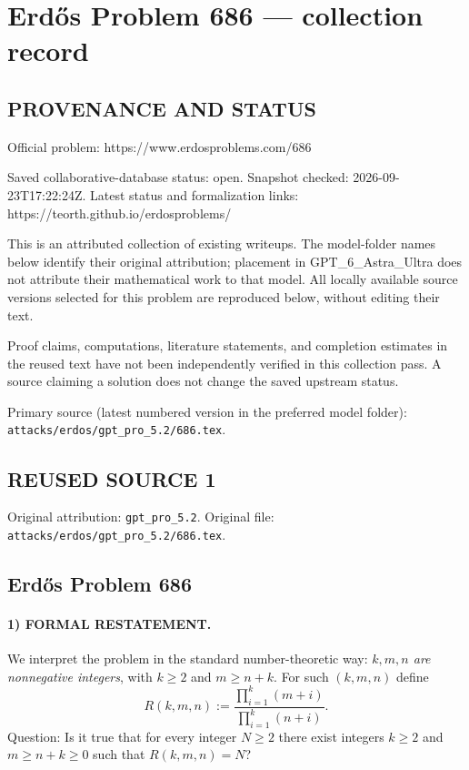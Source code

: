 \section*{Erd\H{o}s Problem 686 --- collection record}

\subsection*{PROVENANCE AND STATUS}
Official problem: https://www.erdosproblems.com/686

Saved collaborative-database status: open.
Snapshot checked: 2026-09-23T17:22:24Z.
Latest status and formalization links: https://teorth.github.io/erdosproblems/

This is an attributed collection of existing writeups. The model-folder names below identify their original attribution; placement in GPT\_6\_Astra\_Ultra does not attribute their mathematical work to that model. All locally available source versions selected for this problem are reproduced below, without editing their text.

Proof claims, computations, literature statements, and completion estimates in the reused text have not been independently verified in this collection pass. A source claiming a solution does not change the saved upstream status.

Primary source (latest numbered version in the preferred model folder): \texttt{attacks/erdos/gpt\_pro\_5.2/686.tex}.

\subsection*{REUSED SOURCE 1}
Original attribution: \texttt{gpt\_pro\_5.2}.
Original file: \texttt{attacks/erdos/gpt\_pro\_5.2/686.tex}.


\subsection*{Erd\H{o}s Problem 686}

\paragraph{1) FORMAL RESTATEMENT.}
We interpret the problem in the standard number-theoretic way:
\emph{$k,m,n$ are nonnegative integers}, with $k\ge 2$ and $m\ge n+k$.
For such $(k,m,n)$ define
\[
R(k,m,n):=\frac{\prod_{i=1}^k (m+i)}{\prod_{i=1}^k (n+i)}.
\]
Question: Is it true that for every integer $N\ge 2$ there exist integers $k\ge 2$ and $m\ge n+k\ge 0$ such that
$R(k,m,n)=N$?

